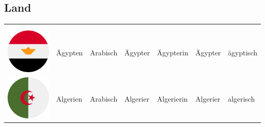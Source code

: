    \subsection{Land}\label{subsection:deutsch:land}

        \begin{longtabu}to 
            \toprule
            &  &  &  &  \\ 
            & & &  &  &  &\\ 
            \toprule \endhead
                \includegraphics[width=0.5\linewidth]{figures/lander/egypt.png} & Ägypten & Arabisch & Ägypter & Ägypterin & Ägypter & ägyptisch\\ \hline
                \includegraphics[width=0.5\linewidth]{figures/lander/algeria.png} & Algerien & Arabisch & Algerier & Algerierin & Algerier & algerisch \\ \hline

\end{longtabu}
